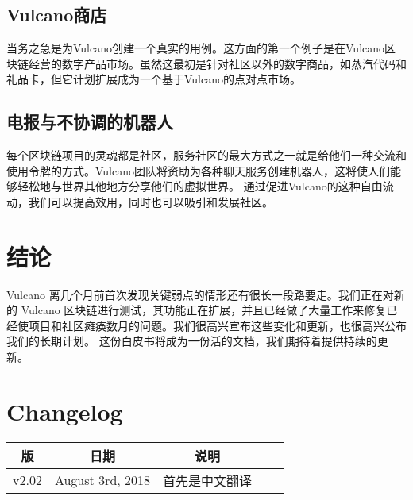 \documentclass[A4paper, 12pt]{article}
\begin{document}
\subsection{Vulcano商店}
当务之急是为Vulcano创建一个真实的用例。这方面的第一个例子是在Vulcano区块链经营的数字产品市场。虽然这最初是针对社区以外的数字商品，如蒸汽代码和礼品卡，但它计划扩展成为一个基于Vulcano的点对点市场。

\subsection{电报与不协调的机器人}
每个区块链项目的灵魂都是社区，服务社区的最大方式之一就是给他们一种交流和使用令牌的方式。Vulcano团队将资助为各种聊天服务创建机器人，这将使人们能够轻松地与世界其他地方分享他们的虚拟世界。  通过促进Vulcano的这种自由流动，我们可以提高效用，同时也可以吸引和发展社区。

\section{结论}
Vulcano 离几个月前首次发现关键弱点的情形还有很长一段路要走。我们正在对新的 Vulcano 区块链进行测试，其功能正在扩展，并且已经做了大量工作来修复已经使项目和社区瘫痪数月的问题。我们很高兴宣布这些变化和更新，也很高兴公布我们的长期计划。  这份白皮书将成为一份活的文档，我们期待着提供持续的更新。
\newpage
\section{Changelog}

\begin{table}[h]
\centering
\begin{tabular}{@{}ccccc@{}}
\toprule
版 & 日期 & 说明 \\ \midrule
v2.02 & August 3rd, 2018 & 首先是中文翻译 \\
 \bottomrule
\end{tabular}
\end{table}
\end{document}
